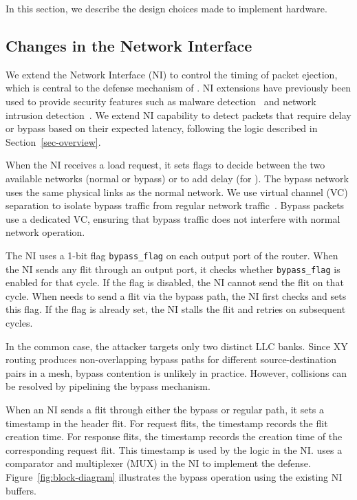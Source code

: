 In this section, we describe the design choices made to implement \scheme{} hardware.

\subsection{Changes in the Network Interface} \label{sec-ni-changes}
We extend the Network Interface (NI) to control the timing of packet ejection, which is central to the defense mechanism of \scheme{}.
NI extensions have previously been used to provide security features such as malware detection~\cite{novo2020flow} and network intrusion detection~\cite{mirsky2018kitsune}.
We extend NI capability to detect packets that require delay or bypass based on their expected latency, following the \scheme{} logic described in Section~\ref{sec-overview}.

When the NI receives a load request, it sets flags to decide between the two available networks (normal or bypass) or to add delay (for \jscheme{}).
The bypass network uses the same physical links as the normal network.
We use virtual channel (VC) separation to isolate bypass traffic from regular network traffic~\cite{duato2001general}.
Bypass packets use a dedicated VC, ensuring that bypass traffic does not interfere with normal network operation.

The NI uses a 1-bit flag \texttt{bypass\_flag} on each output port of the router.
When the NI sends any flit through an output port, it checks whether \texttt{bypass\_flag} is enabled for that cycle.
If the flag is disabled, the NI cannot send the flit on that cycle.
When \bscheme{} needs to send a flit via the bypass path, the NI first checks and sets this flag.
If the flag is already set, the NI stalls the flit and retries on subsequent cycles.

In the common case, the attacker targets only two distinct LLC banks.
Since XY routing produces non-overlapping bypass paths for different source-destination pairs in a mesh, bypass contention is unlikely in practice.
However, collisions can be resolved by pipelining the bypass mechanism.

When an NI sends a flit through either the bypass or regular path, it sets a timestamp in the header flit.
For request flits, the timestamp records the flit creation time.
For response flits, the timestamp records the creation time of the corresponding request flit.
This timestamp is used by the \scheme{} logic in the NI.
\scheme{} uses a comparator and multiplexer (MUX) in the NI to implement the defense.
Figure~\ref{fig:block-diagram} illustrates the bypass operation using the existing NI buffers.

